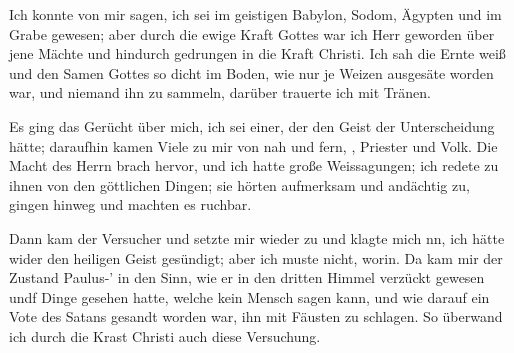 Ich konnte von mir sagen, ich sei im geistigen Babylon, Sodom,
Ägypten und im Grabe gewesen; aber durch die ewige Kraft Gottes
war ich Herr geworden über jene Mächte und hindurch gedrungen
in die Kraft Christi. Ich sah die Ernte weiß und den Samen
Gottes so dicht im Boden, wie nur je Weizen ausgesäte worden
war, und niemand ihn zu sammeln, darüber trauerte ich mit
Tränen.

Es ging das Gerücht über mich, ich sei einer, der den Geist
der Unterscheidung hätte; daraufhin kamen Viele zu mir von nah
und fern, , Priester und Volk. Die Macht des Herrn
brach hervor, und ich hatte große Weissagungen; ich redete zu
ihnen von den göttlichen Dingen; sie hörten aufmerksam und 
andächtig zu, gingen hinweg und machten es ruchbar.


Dann kam der Versucher und setzte mir wieder zu und
klagte mich nn, ich hätte wider den heiligen Geist gesündigt; aber
ich muste nicht, worin. Da kam mir der Zustand Paulus-’ in
den Sinn, wie er in den dritten Himmel verzückt gewesen undf
Dinge gesehen hatte, welche kein Mensch sagen kann, und wie
darauf ein Vote des Satans gesandt worden war, ihn mit
Fäusten zu schlagen. So überwand ich durch die Krast Christi
auch diese Versuchung.

